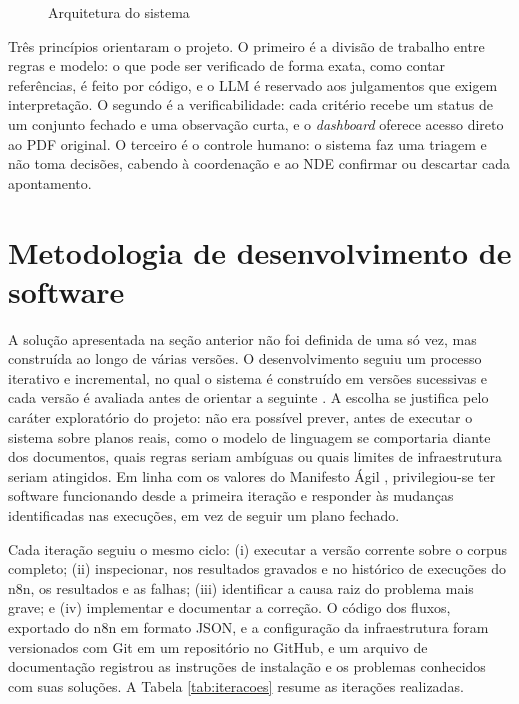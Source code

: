 \begin{figure}[htbp]
\centering
\caption{Arquitetura do sistema}
\label{fig:arquitetura}

\end{figure}

Três princípios orientaram o projeto. O primeiro é a divisão de trabalho entre regras e modelo: o que pode ser verificado de forma exata, como contar referências, é feito por código, e o LLM é reservado aos julgamentos que exigem interpretação. O segundo é a verificabilidade: cada critério recebe um status de um conjunto fechado e uma observação curta, e o \textit{dashboard} oferece acesso direto ao PDF original. O terceiro é o controle humano: o sistema faz uma triagem e não toma decisões, cabendo à coordenação e ao NDE confirmar ou descartar cada apontamento.

\section{Metodologia de desenvolvimento de software}
\label{sec:processo}

A solução apresentada na seção anterior não foi definida de uma só vez, mas construída ao longo de várias versões. O desenvolvimento seguiu um processo iterativo e incremental, no qual o sistema é construído em versões sucessivas e cada versão é avaliada antes de orientar a seguinte \cite{Sommerville2016, Pressman2016}. A escolha se justifica pelo caráter exploratório do projeto: não era possível prever, antes de executar o sistema sobre planos reais, como o modelo de linguagem se comportaria diante dos documentos, quais regras seriam ambíguas ou quais limites de infraestrutura seriam atingidos. Em linha com os valores do Manifesto Ágil \cite{Beck2001}, privilegiou-se ter software funcionando desde a primeira iteração e responder às mudanças identificadas nas execuções, em vez de seguir um plano fechado.

Cada iteração seguiu o mesmo ciclo: (i) executar a versão corrente sobre o corpus completo; (ii) inspecionar, nos resultados gravados e no histórico de execuções do n8n, os resultados e as falhas; (iii) identificar a causa raiz do problema mais grave; e (iv) implementar e documentar a correção. O código dos fluxos, exportado do n8n em formato JSON, e a configuração da infraestrutura foram versionados com Git em um repositório no GitHub, e um arquivo de documentação registrou as instruções de instalação e os problemas conhecidos com suas soluções. A Tabela \ref{tab:iteracoes} resume as iterações realizadas.

